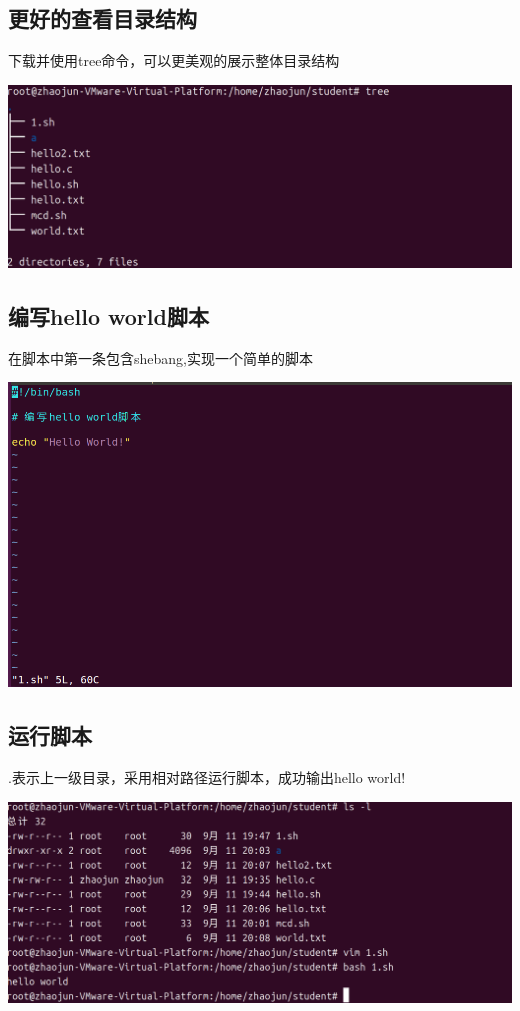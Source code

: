 \documentclass[UTF8,a4paper]{ctexart}
\begin{document}
\begin{sloppypar}
	\subsection{更好的查看目录结构}
	下载并使用tree命令，可以更美观的展示整体目录结构
	
	\includegraphics[width = 16cm]{11}
	
	\subsection{编写hello world脚本}
	在脚本中第一条包含shebang,实现一个简单的脚本
	
	\includegraphics[width = 16cm]{12}
	
	\subsection{运行脚本}
	.表示上一级目录，采用相对路径运行脚本，成功输出hello world!
	
	\includegraphics[width = 16cm]{13}
	

\end{sloppypar}
\end{document}
